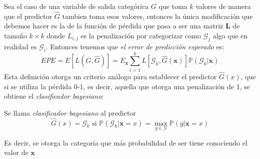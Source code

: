 \noindent Sea el caso de una variable de salida categórica $G$ que toma $k$ valores de manera que el predictor $\hat{G}$ tambien toma esos valores, entonces la única modificación que debemos hacer es la de la función de pérdida que pasa a ser una matriz $\textbf{L}$ de tamaño $k\times k $ donde $L_{i,j}$ es la penalización por categorizar como $\mathcal{G}_j$ algo que en realidad es $\mathcal{G}_i$. Entonces tenemos que \textit{el error de predicción esperado} es: 
\begin{equation}
EPE = E[L(G,\hat{G})]= E_{\textbf{x}}\sum_{i=1}^k L[\mathcal{G}_k, \hat{G}(\textbf{x})]\mathbb{P}(\mathcal{G}_k|\textbf{x})
\end{equation} 
Esta definición otorga un criterio análogo para establecer el predictor $\hat{G}(x)$, que si se utiliza la pérdida 0-1, es decir, aquella que otorga una penalización de 1, se obtiene el \textit{clasificador bayesiano}:
\begin{defi}
Se llama \textit{clasificador bayesiano} al predictor 
\begin{equation}
\hat{G}(x)=\mathcal{G}_k \text{ si } \mathbb{P}(\mathcal{G}_k|\textbf{x}=x)=\max_{g\in \mathcal{G}}\mathbb{P}(g|\textbf{x}=x)
\end{equation}

\noindent Es decir, se otorga la categoría que más probabilidad de ser tiene conociendo el valor de $\textbf{x}$
\end{defi}




















































